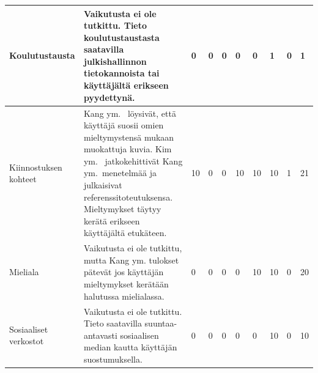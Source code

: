\documentclass[finnish, 12pt, a4paper, elec, utf8, a-1b, online]{aaltothesis}
\begin{document}
{\begin{longtable}{p{2.5cm}|p{6cm}|p{0.5cm}p{0.5cm}p{0.5cm}|p{0.5cm}|p{0.5cm}p{0.5cm}p{0.5cm}|p{0.5cm}|}
    \midrule
    Koulutustausta                         & Vaikutusta ei ole tutkittu. Tieto koulutustaustasta saatavilla julkishallinnon tietokannoista tai käyttäjältä erikseen pyydettynä.                                                                                                                                                                                                                                    & 0                                          & 0                                   & 0                                      & 0                            & 0                                               & 1                                         & 0                                         & 1                            \\
    \midrule
    Kiinnostuksen kohteet                  & Kang ym.~\cite{5539850} löysivät, että käyttäjä suosii omien mieltymystensä mukaan muokattuja kuvia. Kim ym.~\cite{10.1007/978-3-030-58577-8_23} jatkokehittivät Kang ym.~menetelmää ja julkaisivat referenssitoteutuksensa. Mieltymykset täytyy kerätä erikseen käyttäjältä etukäteen.                                                                               & 10                                         & 0                                   & 0                                      & 10                           & 10                                              & 10                                        & 1                                         & 21                           \\
    \midrule
    Mieliala                               & Vaikutusta ei ole tutkittu, mutta Kang ym.\cite{5539850} tulokset pätevät jos käyttäjän mieltymykset kerätään halutussa mielialassa.                                                                                                                                                                                                                                  & 0                                          & 0                                   & 0                                      & 0                            & 10                                              & 10                                        & 0                                         & 20                           \\
    \midrule
    Sosiaaliset verkostot                  & Vaikutusta ei ole tutkittu. Tieto saatavilla suuntaa-antavasti sosiaalisen median kautta käyttäjän suostumuksella.                                                                                                                                                                                                                                                    & 0                                          & 0                                   & 0                                      & 0                            & 0                                               & 10                                        & 0                                         & 10                           \\

\end{longtable}}
\end{document}
